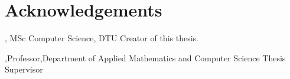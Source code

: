 \section*{Acknowledgements}

\textbf{\thesisauthor}, MSc Computer Science, DTU \newline
Creator of this thesis.

\textbf{\thesissupervisor},Professor,Department of Applied Mathematics  and Computer Science \newline
Thesis Supervisor


